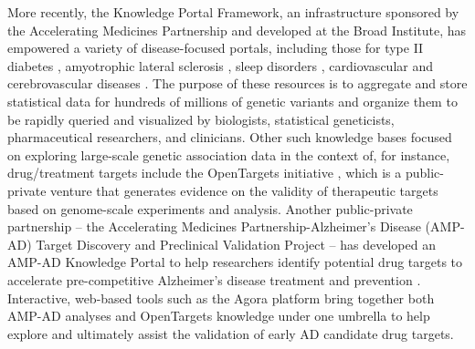 \documentclass[letter]{bib}
\begin{document}
More recently, the Knowledge Portal Framework, an infrastructure sponsored by the Accelerating Medicines Partnership and developed at the Broad Institute, has empowered a variety of disease-focused portals, including those for type II diabetes \citep{Broad:2018:Type}, amyotrophic lateral sclerosis \citep{Broad:2019:ALS}, sleep disorders \citep{Broad:2018:Sleep}, cardiovascular \citep{Broad:2018:Cardiovascular} and cerebrovascular diseases \citep{Broad:2018:Cerebrovascular}.  The purpose of these resources is to aggregate and store statistical data for hundreds of millions of genetic variants and organize them to be rapidly queried and visualized by biologists, statistical geneticists, pharmaceutical researchers, and clinicians.  Other such knowledge bases focused on exploring large-scale genetic association data in the context of, for instance, drug/treatment targets include the OpenTargets initiative \citep{Koscielny:2017:Open}, which is a public-private venture that generates evidence on the validity of therapeutic targets based on genome-scale experiments and analysis.  Another public-private partnership -- the Accelerating Medicines Partnership-Alzheimer's Disease (AMP-AD) Target Discovery and Preclinical Validation Project -- has developed an AMP-AD Knowledge Portal to help researchers identify potential drug targets to accelerate pre-competitive Alzheimer's disease treatment and prevention \citep{NIA:2015:AMP}.  Interactive, web-based tools such as the Agora platform \citep{Agora:2018} bring together both AMP-AD analyses and OpenTargets knowledge under one umbrella to help explore and ultimately assist the validation of early AD candidate drug targets.  
	
\end{document}
